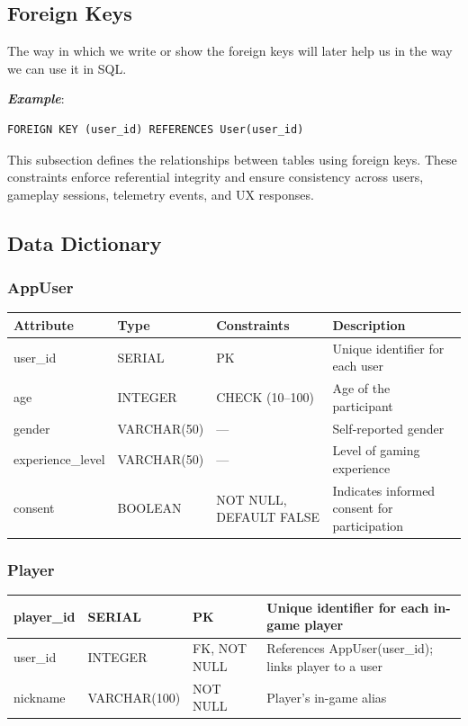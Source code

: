 \documentclass[11pt]{article}
\begin{document}
\subsection{Foreign Keys}

\smallskip
The way in which we write or show the foreign keys will later help us in the way we can use it in SQL.

\smallskip
\textit{\textbf{Example}}:
\begin{lstlisting}[style=sqlstyle]
          FOREIGN KEY (user_id) REFERENCES User(user_id)
\end{lstlisting}


This subsection defines the relationships between tables using foreign keys. These constraints enforce referential integrity and ensure consistency across users, gameplay sessions, telemetry events, and UX responses.


\clearpage
\subsection{Data Dictionary}

\subsubsection*{AppUser}
\begin{tabularx}{\linewidth}{|l|l|l|X|}
\hline
\textbf{Attribute} & \textbf{Type} & \textbf{Constraints} & \textbf{Description} \\
\hline
user\_id & SERIAL & PK & Unique identifier for each user \\
\hline
age & INTEGER & CHECK (10--100) & Age of the participant \\
\hline
gender & VARCHAR(50) & --- & Self-reported gender \\
\hline
experience\_level & VARCHAR(50) & --- & Level of gaming experience \\
\hline
consent & BOOLEAN & NOT NULL, DEFAULT FALSE & Indicates informed consent for participation \\
\hline
\end{tabularx}

\subsubsection*{Player}
\begin{tabularx}{\linewidth}{|l|l|l|X|}
\hline
player\_id & SERIAL & PK & Unique identifier for each in-game player \\
\hline
user\_id & INTEGER & FK, NOT NULL & References AppUser(user\_id); links player to a user \\
\hline
nickname & VARCHAR(100) & NOT NULL & Player's in-game alias \\
\hline
\end{tabularx}
\end{document}
